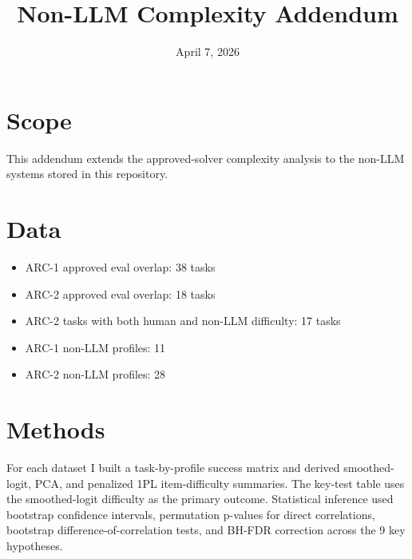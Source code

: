 \documentclass[11pt]{article}
\title{Non-LLM Complexity Addendum}
\author{}
\date{April 7, 2026}
\begin{document}
\maketitle
\section*{Scope}
This addendum extends the approved-solver complexity analysis to the non-LLM systems stored in this repository.
\section*{Data}
\begin{itemize}
  \item ARC-1 approved eval overlap: 38 tasks
  \item ARC-2 approved eval overlap: 18 tasks
  \item ARC-2 tasks with both human and non-LLM difficulty: 17 tasks
  \item ARC-1 non-LLM profiles: 11
  \item ARC-2 non-LLM profiles: 28
\end{itemize}
\section*{Methods}
For each dataset I built a task-by-profile success matrix and derived smoothed-logit, PCA, and penalized 1PL item-difficulty summaries. The key-test table uses the smoothed-logit difficulty as the primary outcome. Statistical inference used bootstrap confidence intervals, permutation p-values for direct correlations, bootstrap difference-of-correlation tests, and BH-FDR correction across the 9 key hypotheses.
\end{document}
